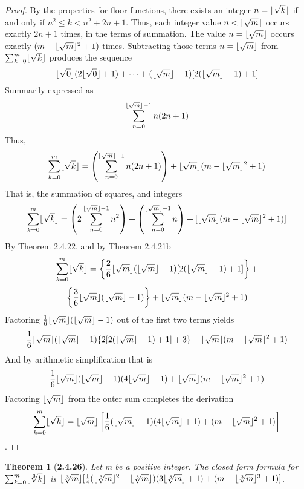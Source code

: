 \documentclass[a4paper, 12pt]{article}
\theoremstyle{plain}
\newtheorem*{theorem*}{Theorem}
\DeclarePairedDelimiter{\floor}{\lfloor}{\rfloor}
\begin{document}
\begin{proof}
    By the properties for floor functions, there exists an integer $n = \floor{\sqrt{k}}$ 
    if and only if $n^{2} \le k < n^{2} + 2n + 1$. Thus, each integer value 
    $n < \floor{\sqrt{m}}$ occurs exactly $2n + 1$ times, in the terms of summation. The value
    $n = \floor{\sqrt{m}}$ occurs exactly $(m - \floor{\sqrt{m}}^{2} + 1)$ times. Subtracting 
    those terms $n = \floor{\sqrt{m}}$ from $\sum_{k=0}^{m} \floor{\sqrt{k}}$ produces the 
    sequence $$\floor{\sqrt{0}}(2\floor{\sqrt{0}} + 1) + \dots + 
    (\floor{\sqrt{m}}-1)[2(\floor{\sqrt{m}}-1) + 1]$$
    Summarily expressed as $$\sum_{n=0}^{\floor{\sqrt{m}}-1} n(2n + 1)$$ Thus,
    $$\sum_{k=0}^{m} \floor{\sqrt{k}} = 
    \left(\sum_{n=0}^{\floor{\sqrt{m}}-1} n(2n + 1)\right) + 
    \floor{\sqrt{m}}(m - \floor{\sqrt{m}}^{2} + 1)$$
    That is, the summation of squares, and integers
    $$\sum_{k=0}^{m} \floor{\sqrt{k}} = 
    \left(2\sum_{n=0}^{\floor{\sqrt{m}}-1} n^{2}\right) + 
    \left(\sum_{n=0}^{\floor{\sqrt{m}}-1} n\right) + 
    [\floor{\sqrt{m}}(m - \floor{\sqrt{m}}^{2} + 1)]$$
    By Theorem 2.4.22, and by Theorem 2.4.21b
    $$\sum_{k=0}^{m} \floor{\sqrt{k}} = 
    \left\{\frac{2}{6}\floor{\sqrt{m}}(\floor{\sqrt{m}}-1)[2(\floor{\sqrt{m}}-1)+1]\right\}+$$
    $$\left\{\frac{3}{6}\floor{\sqrt{m}}(\floor{\sqrt{m}}-1)\right\} + \floor{\sqrt{m}}(m - 
    \floor{\sqrt{m}}^{2} + 1)$$
    Factoring $\frac{1}{6}\floor{\sqrt{m}}(\floor{\sqrt{m}}-1)$ out of the first two terms 
    yields 
    $$\frac{1}{6}\floor{\sqrt{m}}(\floor{\sqrt{m}}-1)\{2[2(\floor{\sqrt{m}}-1)+1] +3\}+
    \floor{\sqrt{m}}(m - \floor{\sqrt{m}}^{2} + 1)$$
    And by arithmetic simplification that is
    $$\frac{1}{6}\floor{\sqrt{m}}(\floor{\sqrt{m}}-1)(4\floor{\sqrt{m}} + 1) + 
    \floor{\sqrt{m}}(m - \floor{\sqrt{m}}^{2} + 1)$$
    Factoring $\floor{\sqrt{m}}$ from the outer sum completes the derivation
    $$\sum_{k=0}^{m} \floor{\sqrt{k}} = 
    \floor{\sqrt{m}}\left[\frac{1}{6}(\floor{\sqrt{m}}-1)(4\floor{\sqrt{m}}+1) + 
    (m - \floor{\sqrt{m}}^{2} + 1)\right]$$.
\end{proof}

\pagebreak


\begin{theorem*}[\textbf{2.4.26}]
    Let m be a positive integer. The closed form formula for $\sum_{k=0}^{m} \floor{\sqrt[3]{k}}$ 
    is $\floor{\sqrt[3]{m}}
    [\frac{1}{4}(\floor{\sqrt[3]{m}}^{2} - \floor{\sqrt[3]{m}})(3\floor{\sqrt[3]{m}}+1)+
    (m - \floor{\sqrt[3]{m}}^{3} + 1)]$.
\end{theorem*}
\end{document}
